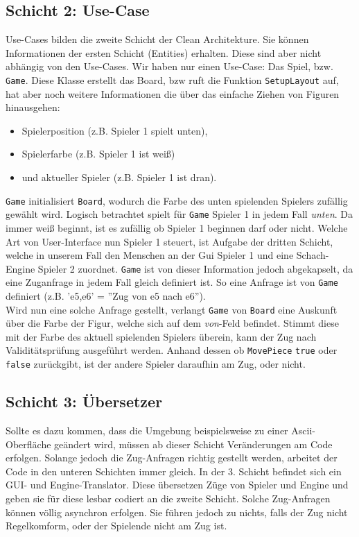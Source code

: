 \documentclass[
10pt, %
a4paper, %
oneside, %
headinclude,footinclude, %
BCOR5mm, %
]{scrartcl}
\begin{document}
\begin{onehalfspace}
\subsection{Schicht 2: Use-Case}
Use-Cases bilden die zweite Schicht der Clean Architekture. Sie können Informationen der ersten Schicht (Entities) erhalten. Diese sind aber nicht abhängig von den Use-Cases.
Wir haben nur einen Use-Case: Das Spiel, bzw. \texttt{Game}. Diese Klasse erstellt das Board, bzw ruft die Funktion \texttt{SetupLayout} auf, hat aber noch weitere Informationen die über das einfache Ziehen von Figuren hinausgehen:
\begin{center}
	\begin{itemize}
		\item Spielerposition (z.B. Spieler 1 spielt unten),
		\item Spielerfarbe (z.B. Spieler 1 ist weiß)
		\item und aktueller Spieler (z.B. Spieler 1 ist dran).
	\end{itemize}
\end{center}
\texttt{Game} initialisiert \texttt{Board}, wodurch die Farbe des unten spielenden Spielers zufällig gewählt wird. Logisch betrachtet spielt für \texttt{Game} Spieler 1 in jedem Fall \textit{unten}. Da immer weiß beginnt, ist es zufällig ob Spieler 1 beginnen darf oder nicht. Welche Art von User-Interface nun Spieler 1 steuert, ist Aufgabe der dritten Schicht, welche in unserem Fall den Menschen an der Gui Spieler 1 und eine Schach-Engine Spieler 2 zuordnet. \texttt{Game} ist von dieser Information jedoch abgekapselt, da eine Zuganfrage in jedem Fall gleich definiert ist.
So eine Anfrage ist von \texttt{Game} definiert (z.B. 'e5,e6' = ''Zug von e5 nach e6''). \\
Wird nun eine solche Anfrage gestellt, verlangt \texttt{Game} von \texttt{Board} eine Auskunft über die Farbe der Figur, welche sich auf dem \textit{von}-Feld befindet. Stimmt diese mit der Farbe des aktuell spielenden Spielers überein, kann der Zug nach Validitätsprüfung ausgeführt werden. Anhand dessen ob \texttt{MovePiece} \texttt{true} oder \texttt{false} zurückgibt, ist der andere Spieler daraufhin am Zug, oder nicht.
\subsection{Schicht 3: Übersetzer}
Sollte es dazu kommen, dass die Umgebung beispielsweise zu einer Ascii-Oberfläche geändert wird, müssen ab dieser Schicht Veränderungen am Code erfolgen. Solange jedoch die Zug-Anfragen richtig gestellt werden, arbeitet der Code in den unteren Schichten immer gleich. In der 3. Schicht befindet sich ein GUI- und Engine-Translator. Diese übersetzen Züge von Spieler und Engine und geben sie für diese lesbar codiert an die zweite Schicht. 
Solche Zug-Anfragen können völlig asynchron erfolgen. Sie führen jedoch zu nichts, falls der Zug nicht Regelkomform, oder der Spielende nicht am Zug ist.

\end{onehalfspace}
\end{document}
